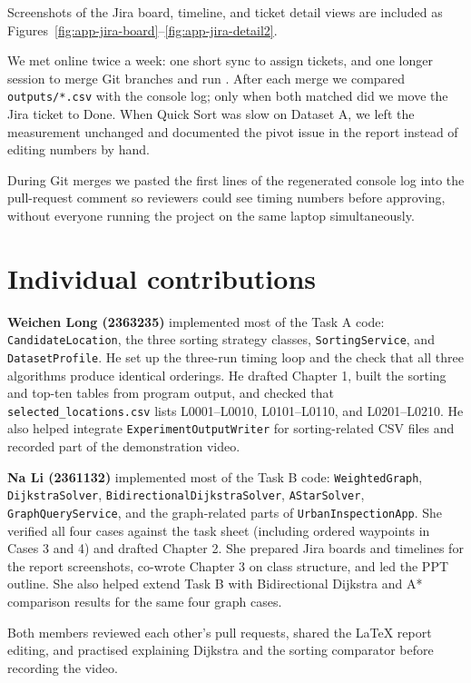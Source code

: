\documentclass[12pt,a4paper,twocolumn,openany]{report}
\newcommand{\p}[1]{\path{#1}}
\begin{document}
Screenshots of the Jira board, timeline, and ticket detail views are included as Figures~\ref{fig:app-jira-board}--\ref{fig:app-jira-detail2}.

We met online twice a week: one short sync to assign tickets, and one longer session to merge Git branches and run \p{UrbanInspectionApp.main}. 
After each merge we compared \texttt{outputs/*.csv} with the console log; only when both matched did we move the Jira ticket to Done. 
When Quick Sort was slow on Dataset A, we left the measurement unchanged and documented the pivot issue in the report instead of editing numbers by hand.

During Git merges we pasted the first lines of the regenerated console log into the pull-request comment so reviewers could see timing numbers before approving, without everyone running the project on the same laptop simultaneously.

\section{Individual contributions}
\textbf{Weichen Long (2363235)} implemented most of the Task A code: \texttt{CandidateLocation}, the three sorting strategy classes, \texttt{SortingService}, and \texttt{DatasetProfile}. 
He set up the three-run timing loop and the check that all three algorithms produce identical orderings. 
He drafted Chapter 1, built the sorting and top-ten tables from program output, and checked that \texttt{selected\_locations.csv} lists L0001--L0010, L0101--L0110, and L0201--L0210. 
He also helped integrate \texttt{ExperimentOutputWriter} for sorting-related CSV files and recorded part of the demonstration video.

\textbf{Na Li (2361132)} implemented most of the Task B code: \texttt{WeightedGraph}, \texttt{DijkstraSolver}, \texttt{BidirectionalDijkstraSolver}, \texttt{AStarSolver}, \texttt{GraphQueryService}, and the graph-related parts of \texttt{UrbanInspectionApp}. 
She verified all four cases against the task sheet (including ordered waypoints in Cases 3 and 4) and drafted Chapter 2. 
She prepared Jira boards and timelines for the report screenshots, co-wrote Chapter 3 on class structure, and led the PPT outline. 
She also helped extend Task B with Bidirectional Dijkstra and A* comparison results for the same four graph cases.

Both members reviewed each other's pull requests, shared the LaTeX report editing, and practised explaining Dijkstra and the sorting comparator before recording the video.
\end{document}
